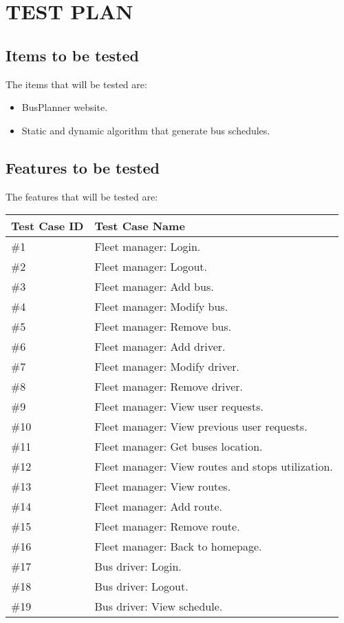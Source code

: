\section{TEST PLAN}

\subsection{Items to be tested}
The items that will be tested are:
\begin{itemize}
	\item BusPlanner website.
	\item Static and dynamic algorithm that generate bus schedules.
\end{itemize}

\subsection{Features to be tested}
The features that will be tested are:
\begin{center}
	\begin{tabular} { | m{3cm} | m{10cm} | }
		\hline
		\textbf{Test Case ID} & \textbf{Test Case Name}\\
		\hline
		\#1 & Fleet manager: Login.\\
		\hline
		\#2 & Fleet manager: Logout.\\
		\hline
		\#3 & Fleet manager: Add bus.\\
		\hline
		\#4 & Fleet manager: Modify bus.\\
		\hline
		\#5 & Fleet manager: Remove bus.\\
		\hline
		\#6 & Fleet manager: Add driver.\\
		\hline
		\#7 & Fleet manager: Modify driver.\\
		\hline
		\#8 & Fleet manager: Remove driver.\\
		\hline
		\#9 & Fleet manager: View user requests.\\
		\hline
		\#10 & Fleet manager: View previous user requests.\\
		\hline
		\#11 & Fleet manager: Get buses location.\\
		\hline
		\#12 & Fleet manager: View routes and stops utilization.\\
		\hline
		\#13 & Fleet manager: View routes.\\
		\hline
		\#14 & Fleet manager: Add route.\\
		\hline
		\#15 & Fleet manager: Remove route.\\
		\hline
		\#16 & Fleet manager: Back to homepage.\\
		\hline
		\#17 & Bus driver: Login.\\
		\hline
		\#18 & Bus driver: Logout.\\
		\hline
		\#19 & Bus driver: View schedule.\\
		\hline
	\end{tabular}
\end{center}
\newpage
